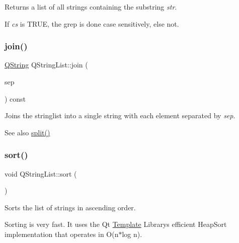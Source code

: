 Returns a list of all strings containing the substring {\itshape str}.

If {\itshape cs} is T\+R\+UE, the grep is done case sensitively, else not. \mbox{\label{class_q_string_list_a4d14f4987725926a5c812991a27d0f91}} 
\subsubsection{\texorpdfstring{join()}{join()}}
{\footnotesize\ttfamily \mbox{\hyperlink{class_q_string}{Q\+String}} Q\+String\+List\+::join (\begin{DoxyParamCaption}\item[{const \mbox{\hyperlink{class_q_string}{Q\+String}} \&}]{sep }\end{DoxyParamCaption}) const}

Joins the stringlist into a single string with each element separated by {\itshape sep}.

\begin{DoxySeeAlso}{See also}
\mbox{\hyperlink{class_q_string_list_a2c21b167a54aa8a8082996d7f18ca5bd}{split()}} 
\end{DoxySeeAlso}
\mbox{\label{class_q_string_list_a1b3bf672d6dd980fb487e9392fdd9bd6}} 
\subsubsection{\texorpdfstring{sort()}{sort()}}
{\footnotesize\ttfamily void Q\+String\+List\+::sort (\begin{DoxyParamCaption}{ }\end{DoxyParamCaption})}

Sorts the list of strings in ascending order.

Sorting is very fast. It uses the Qt \mbox{\hyperlink{class_template}{Template}} Library\textquotesingle{}s efficient Heap\+Sort implementation that operates in O(n$\ast$log n). \mbox{\label{class_q_string_list_a57bbbd781091ae194b64138970497a87}} 
